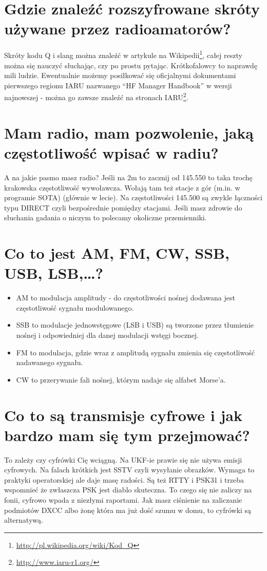 \documentclass[a4paper,12pt]{article}
\begin{document}
\section{Gdzie znaleźć rozszyfrowane skróty używane przez radioamatorów?}
Skróty kodu Q i slang można znaleźć w artykule na Wikipedii\footnote{\url{http://pl.wikipedia.org/wiki/Kod_Q}}, całej reszty można się nauczyć słuchając, czy po prostu pytając. Krótkofalowcy to naprawdę mili ludzie. Ewentualnie możemy posiłkować się oficjalnymi dokumentami pierwszego regionu IARU nazwanego “HF Manager Handbook” w wersji najnowszej - można go zawsze znaleźć na stronach IARU\footnote{\url{http://www.iaru-r1.org/}}.

\section{Mam radio, mam pozwolenie, jaką częstotliwość wpisać w radiu?}
A na jakie pasmo masz radio?
Jeśli na 2m to zacznij od 145.550 to taka trochę krakowska częstotliwość wywoławcza. Wołają tam też stacje z gór (m.in. w programie SOTA) (głównie w lecie). Na częstotliwości 145.500 są zwykle łączności typu DIRECT czyli bezpośrednie pomiędzy stacjami. Jeśli masz zdrowie do słuchania gadania o niczym to polecamy okoliczne przemienniki.

\section{Co to jest AM, FM, CW, SSB, USB, LSB,…?}
\begin{itemize}
\item AM to modulacja amplitudy - do częstotliwości nośnej dodawana jest częstotliwość sygnału modulowanego. 
\item SSB to modulacje jednowstęgowe (LSB i USB) są tworzone przez tłumienie nośnej i odpowiedniej dla danej modulacji wstęgi bocznej. 
\item FM to modulacja, gdzie wraz z amplitudą sygnału zmienia się częstotliwość nadawanego sygnału. 
\item CW to przerywanie fali nośnej, którym nadaje się alfabet Morse'a. \end{itemize}


\section{Co to są transmisje cyfrowe i jak bardzo mam się tym przejmować?}
To zależy czy cyfrówki Cię wciągną. 
Na UKF-ie prawie się nie używa emisji cyfrowych. 
Na falach krótkich jest SSTV czyli wysyłanie obrazków. Wymaga to praktyki operatorskiej ale daje masę radości. Są też RTTY i PSK31 i trzeba wspomnieć że zwłaszcza PSK jest diablo skuteczna. To czego się nie zaliczy na fonii, cyfrowo wpada z niezłymi raportami. 
Jak masz ciśnienie na zaliczanie podmiotów DXCC albo żonę która ma już dość szumu w domu, to cyfrówki są alternatywą.
\end{document}
